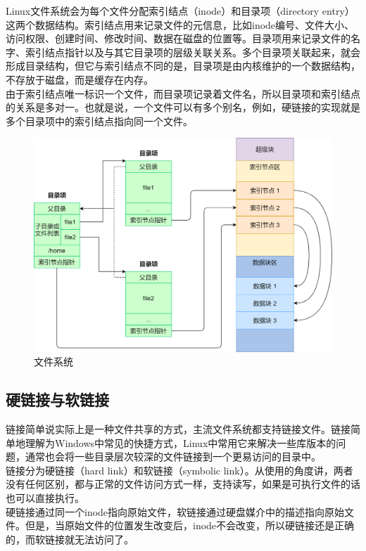 Linux文件系统会为每个文件分配索引结点（inode）和目录项（directory entry）这两个数据结构。索引结点用来记录文件的元信息，比如inode编号、文件大小、访问权限、创建时间、修改时间、数据在磁盘的位置等。目录项用来记录文件的名字、索引结点指针以及与其它目录项的层级关联关系。多个目录项关联起来，就会形成目录结构，但它与索引结点不同的是，目录项是由内核维护的一个数据结构，不存放于磁盘，而是缓存在内存。 \\

由于索引结点唯一标识一个文件，而目录项记录着文件名，所以目录项和索引结点的关系是多对一。也就是说，一个文件可以有多个别名，例如，硬链接的实现就是多个目录项中的索引结点指向同一个文件。

\begin{figure}[H]
	\centering
	\includegraphics[scale=0.35]{img/C5/5-3/1.png}
	\caption{文件系统}
\end{figure}

\subsection{硬链接与软链接}

链接简单说实际上是一种文件共享的方式，主流文件系统都支持链接文件。链接简单地理解为Windows中常见的快捷方式，Linux中常用它来解决一些库版本的问题，通常也会将一些目录层次较深的文件链接到一个更易访问的目录中。 \\

链接分为硬链接（hard link）和软链接（symbolic link）。从使用的角度讲，两者没有任何区别，都与正常的文件访问方式一样，支持读写，如果是可执行文件的话也可以直接执行。 \\

硬链接通过同一个inode指向原始文件，软链接通过硬盘媒介中的描述指向原始文件。但是，当原始文件的位置发生改变后，inode不会改变，所以硬链接还是正确的，而软链接就无法访问了。

